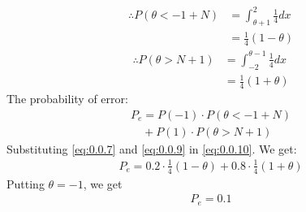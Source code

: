 \documentclass[journal,12pt,twocolumn]{IEEEtran}
\begin{document}
\\
\begin{align}
\therefore
    P(\theta < -1 + N) &= \int_{\theta + 1}^2 \frac{1}{4}dx\\
    &= \frac{1}{4}(1-\theta)\label{eq:0.0.7}
\end{align}
\begin{align}
\therefore
    P(\theta> N + 1) &= \int_{-2}^{\theta -1} \frac{1}{4}dx\\
    &= \frac{1}{4}(1+\theta)\label{eq:0.0.9}
\end{align}
The probability of error:
\begin{align}
\nonumber
    P_e = P(-1)\cdot {P(\theta < -1 + N)} \\ 
            \quad+ P(1)\cdot {P(\theta> N + 1)}\label{eq:0.0.10}
\end{align}
Substituting \eqref{eq:0.0.7} and \eqref{eq:0.0.9} in \eqref{eq:0.0.10}. We get:
\begin{align}
    P_e = 0.2\cdot \frac{1}{4}(1-\theta) + 0.8\cdot \frac{1}{4}(1+\theta)
\end{align}
Putting $\theta = -1$, we get
\begin{align}
    P_e = 0.1
\end{align}
    
\end{document}
